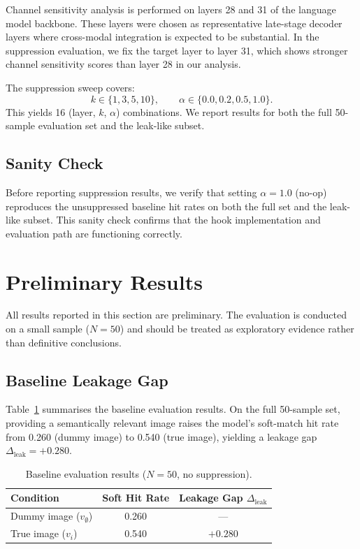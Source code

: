 \documentclass[12pt, a4paper]{article}
\newcommand{\leakgap}{\ensuremath{\Delta_{\text{leak}}}}
\begin{document}
Channel sensitivity analysis is performed on layers 28 and 31 of the language model
backbone.
These layers were chosen as representative late-stage decoder layers where cross-modal
integration is expected to be substantial.
In the suppression evaluation, we fix the target layer to layer 31, which shows
stronger channel sensitivity scores than layer 28 in our analysis.

The suppression sweep covers:
\[
  k \in \{1, 3, 5, 10\}, \qquad \alpha \in \{0.0, 0.2, 0.5, 1.0\}.
\]
This yields 16 (layer, $k$, $\alpha$) combinations.
We report results for both the full 50-sample evaluation set and the leak-like subset.

\subsection{Sanity Check}

Before reporting suppression results, we verify that setting $\alpha = 1.0$ (no-op)
reproduces the unsuppressed baseline hit rates on both the full set and the leak-like
subset.
This sanity check confirms that the hook implementation and evaluation path are
functioning correctly.


\section{Preliminary Results}
\label{sec:results}

All results reported in this section are preliminary.
The evaluation is conducted on a small sample ($N = 50$) and should be treated as
exploratory evidence rather than definitive conclusions.

\subsection{Baseline Leakage Gap}

Table~\ref{tab:baseline} summarises the baseline evaluation results.
On the full 50-sample set, providing a semantically relevant image raises the model's
soft-match hit rate from 0.260 (dummy image) to 0.540 (true image), yielding a leakage
gap $\leakgap = +0.280$.

\begin{table}[h]
\centering
\caption{Baseline evaluation results ($N = 50$, no suppression).}
\label{tab:baseline}
\begin{tabular}{lcc}
\toprule
\textbf{Condition}           & \textbf{Soft Hit Rate} & \textbf{Leakage Gap $\leakgap$} \\
\midrule
Dummy image ($v_{\emptyset}$) & 0.260 & --- \\
True image ($v_i$)            & 0.540 & $+0.280$ \\
\bottomrule
\end{tabular}
\end{table}
\end{document}
